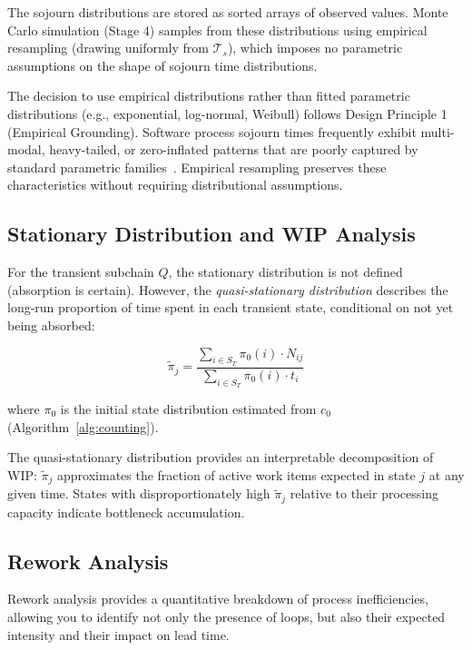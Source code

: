 The sojourn distributions are stored as sorted arrays of observed values. 
Monte Carlo simulation (Stage 4) samples from these distributions using 
empirical resampling (drawing uniformly from $\mathcal{T}_s$), which 
imposes no parametric assumptions on the shape of sojourn time 
distributions.

\begin{remark}
\label{rem:nonparametric}
The decision to use empirical distributions rather than fitted parametric 
distributions (e.g., exponential, log-normal, Weibull) follows Design 
Principle 1 (Empirical Grounding). Software process sojourn times 
frequently exhibit multi-modal, heavy-tailed, or zero-inflated patterns that are poorly captured by standard parametric 
families~\cite{vacanti2015}. Empirical resampling preserves 
these characteristics without requiring distributional assumptions.
\end{remark}


\subsection{Stationary Distribution and WIP Analysis}
\label{sec:s3-stationary}

For the transient subchain $Q$, the stationary distribution is not 
defined (absorption is certain). However, the \emph{quasi-stationary 
distribution} describes the long-run proportion of time spent in each 
transient state, conditional on not yet being absorbed:

\begin{equation}
\label{eq:quasi-stationary}
\tilde{\pi}_j = \frac{\sum_{i \in S_T} \pi_0(i) \cdot N_{ij}}
    {\sum_{i \in S_T} \pi_0(i) \cdot t_i}
\end{equation}

where $\pi_0$ is the initial state distribution estimated from $c_0$ 
(Algorithm~\ref{alg:counting}).

The quasi-stationary distribution provides an interpretable decomposition 
of WIP: $\tilde{\pi}_j$ approximates the fraction of active work items 
expected in state $j$ at any given time. States with disproportionately 
high $\tilde{\pi}_j$ relative to their processing capacity indicate 
bottleneck accumulation.


\subsection{Rework Analysis}
\label{sec:s3-rework}
Rework analysis provides a quantitative breakdown of process inefficiencies, allowing you to identify not only the presence of loops, but also their expected intensity and their impact on lead time.


